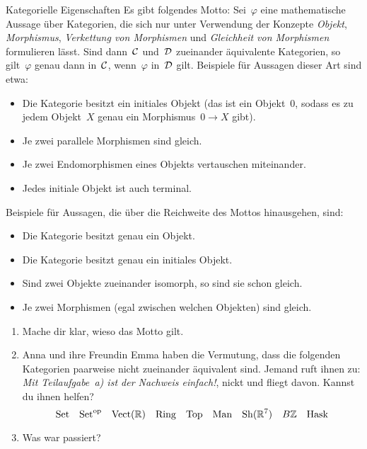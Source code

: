 \documentclass{uebblatt}
\begin{document}
\begin{aufgabe}{Kategorielle Eigenschaften}
Es gibt folgendes Motto: Sei~$\varphi$ eine mathematische Aussage über Kategorien, die
sich nur unter Verwendung der Konzepte \emph{Objekt}, \emph{Morphismus},
\emph{Verkettung von Morphismen} und \emph{Gleichheit von Morphismen}
formulieren lässt. Sind dann~$\mathcal{C}$ und~$\mathcal{D}$ zueinander äquivalente Kategorien,
so gilt~$\varphi$ genau dann in~$\mathcal{C}$, wenn~$\varphi$ in~$\mathcal{D}$ gilt.
Beispiele für Aussagen dieser Art sind etwa:
\begin{itemize}
\item Die Kategorie besitzt ein initiales Objekt (das ist ein Objekt~$0$,
sodass es zu jedem Objekt~$X$ genau ein Morphismus~$0 \to X$ gibt).
\item Je zwei parallele Morphismen sind gleich.
\item Je zwei Endomorphismen eines Objekts vertauschen miteinander.
\item Jedes initiale Objekt ist auch terminal.
\end{itemize}
Beispiele für Aussagen, die über die Reichweite des Mottos hinausgehen, sind:
\begin{itemize}
\item Die Kategorie besitzt genau ein Objekt.
\item Die Kategorie besitzt genau ein initiales Objekt.
\item Sind zwei Objekte zueinander isomorph, so sind sie schon gleich.
\item Je zwei Morphismen (egal zwischen welchen Objekten) sind gleich.
\end{itemize}

\begin{enumerate}
\item Mache dir klar, wieso das Motto gilt.
\item Anna und ihre Freundin Emma haben die Vermutung, dass die folgenden
Kategorien paarweise nicht zueinander äquivalent sind. Jemand ruft ihnen zu:
\emph{Mit Teilaufgabe~a) ist der Nachweis einfach!}, nickt und fliegt davon. Kannst du ihnen
helfen?
\[ \mathrm{Set} \quad
  \mathrm{Set}^{\mathrm{op}} \quad
  \mathrm{Vect}(\mathbb{R}) \quad
  \mathrm{Ring} \quad
  \mathrm{Top} \quad
  \mathrm{Man} \quad
  \mathrm{Sh}(\mathbb{R}^7) \quad
  B\mathbb{Z} \quad
  \mathrm{Hask}
\]
\item Was war passiert?
\end{enumerate}
\end{aufgabe}
\newpage
\end{document}
